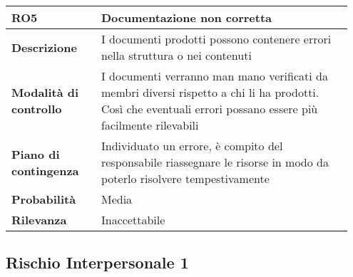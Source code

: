 \begin{table}[H]
    \bgroup
    \def\arraystretch{1.5}
    \begin{tabular} {
            | p{0.25\linewidth} | p{0.70\linewidth} |
        }
        \hline
        \textbf{RO5}                   & \textbf{Documentazione non corretta}                                                                                                                         \\
        \hline
        \textbf{Descrizione}           & I documenti prodotti possono contenere errori nella struttura o nei contenuti                                                                                \\
        \hline
        \textbf{Modalità di controllo} & I documenti verranno man mano verificati da membri diversi rispetto a chi li ha prodotti. Così che eventuali errori possano essere più facilmente rilevabili \\
        \hline
        \textbf{Piano di contingenza}  & Individuato un errore, è compito del responsabile riassegnare le risorse in modo da poterlo risolvere tempestivamente                                        \\
        \hline
        \textbf{Probabilità}           & Media                                                                                                                                                        \\
        \hline
        \textbf{Rilevanza}             & Inaccettabile                                                                                                                                                \\
        \hline
    \end{tabular}
    \egroup
\end{table}

\subsection{Rischio Interpersonale 1}

